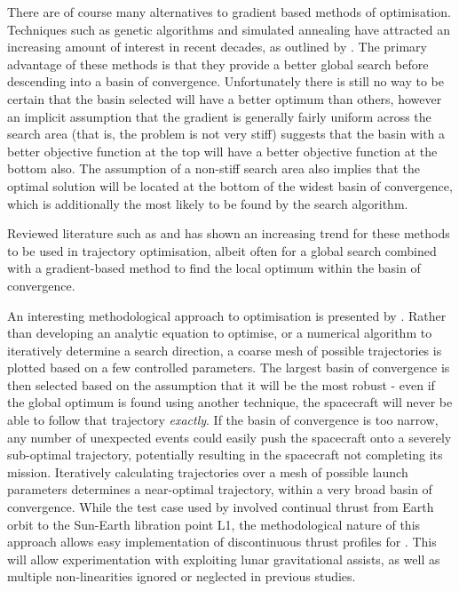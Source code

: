 There are of course many alternatives to gradient based methods of optimisation. Techniques such as genetic algorithms and simulated annealing have attracted an increasing amount of interest in recent decades, as outlined by \textcite{Ren2007}. The primary advantage of these methods is that they provide a better global search before descending into a basin of convergence. Unfortunately there is still no way to be certain that the basin selected will have a better optimum than others, however an implicit assumption that the gradient is generally fairly uniform across the search area (that is, the problem is not very stiff) suggests that the basin with a better objective function at the top will have a better objective function at the bottom also. The assumption of a non-stiff search area also implies that the optimal solution will be located at the bottom of the widest basin of convergence, which is additionally the most likely to be found by the search algorithm.

Reviewed literature such as \textcite{Dachwald2005} and \textcite{Jackson2008} has shown an increasing trend for these methods to be used in trajectory optimisation, albeit often for a global search combined with a gradient-based method to find the local optimum within the basin of convergence. 

An interesting methodological approach to optimisation is presented by \textcite{Jackson2008}. Rather than developing an analytic equation to optimise, or a numerical algorithm to iteratively determine a search direction, a coarse mesh of possible trajectories is plotted based on a few controlled parameters. The largest basin of convergence is then selected based on the assumption that it will be the most robust - even if the global optimum is found using another technique, the spacecraft will never be able to follow that trajectory \emph{exactly}. If the basin of convergence is too narrow, any number of unexpected events could easily push the spacecraft onto a severely sub-optimal trajectory, potentially resulting in the spacecraft not completing its mission. Iteratively calculating trajectories over a mesh of possible launch parameters determines a near-optimal trajectory, within a very broad basin of convergence. While the test case used by \textcite{Jackson2008} involved continual thrust from Earth orbit to the Sun-Earth libration point L1, the methodological nature of this approach allows easy implementation of discontinuous thrust profiles for \BW. This will allow experimentation with exploiting lunar gravitational assists, as well as multiple non-linearities ignored or neglected in previous studies.

